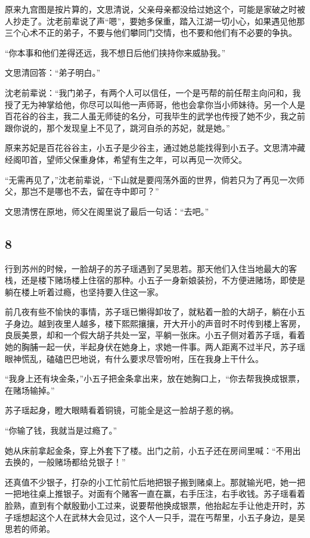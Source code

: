 原来九宫图是按片算的，文思清说，父亲母亲都没给过她这个，可能是家破之时被人抄走了。沈老前辈说了声“嗯”，要她多保重，踏入江湖一切小心，如果遇见他那三个心术不正的弟子，不要与他们攀同门交情，也不要和他们有不必要的争执。

“你本事和他们差得还远，我不想日后他们挟持你来威胁我。”

文思清回答：“弟子明白。”

沈老前辈说：“我门弟子，有两个人可以信任，一个是丐帮的前任帮主向问和，我授了无为神掌给他，你尽可以叫他一声师哥，他也会拿你当小师妹待。另一个人是百花谷的谷主，我二人虽无师徒的名分，可我毕生的武学也传授了她不少，我之前跟你说的，那个发现皇上不见了，跳河自杀的苏妃，就是她。”

原来苏妃是百花谷谷主，小五子是少谷主，通过她总能找得到小五子。文思清冲藏经阁叩首，望师父保重身体，希望有生之年，可以再见一次师父。

“无需再见了，”沈老前辈说，“下山就是要闯荡外面的世界，倘若只为了再见一次师父，那岂不是哪也不去，留在寺中即可？”

文思清愣在原地，师父在阁里说了最后一句话：“去吧。”
\newline

{\centering\subsection{8}}

行到苏州的时候，一脸胡子的苏子瑶遇到了吴思若。那天他们入住当地最大的客栈，还是楼下赌场楼上住宿的那种。小五子一身新娘装扮，不方便进赌场，即使是躺在楼上听着过瘾，也坚持要入住这一家。

前几夜有些不愉快的事情，苏子瑶已懒得卸妆了，就粘着一脸的大胡子，躺在小五子身边。越到夜里人越多，楼下熙熙攘攘，开大开小的声音时不时传到楼上客房，良辰美景，却和一个假大胡子共处一室，平躺一张床。小五子侧对着苏子瑶，看着她的胸脯一起一伏，半起身伏在她身上，求她一件事。两人距离不过半尺，苏子瑶眼神慌乱，磕磕巴巴地说，有什么要求尽管吩咐，压在我身上干什么。

“我身上还有块金条，”小五子把金条拿出来，放在她胸口上，“你去帮我换成银票，在赌场输掉。”

苏子瑶起身，瞪大眼睛看着铜镜，可能全是这一脸胡子惹的祸。

“你输了钱，我就当是过瘾了。”

她从床前拿起金条，穿上外套下了楼。出门之前，小五子还在房间里喊：“不用出去换的，一般赌场都给兑银子！”

还真值不少银子，打杂的小工忙前忙后地把银子搬到赌桌上。那就输光吧，她一把一把地往桌上推银子。对面有个赌客一直在赢，右手压注，右手收钱。苏子瑶看着脸熟，直到有个献殷勤小工过来，说要帮他换成银票，他抬起左手让他走开时，苏子瑶想起这个人在武林大会见过，这个人一只手，混在丐帮里，小五子身边，是吴思若的师弟。

